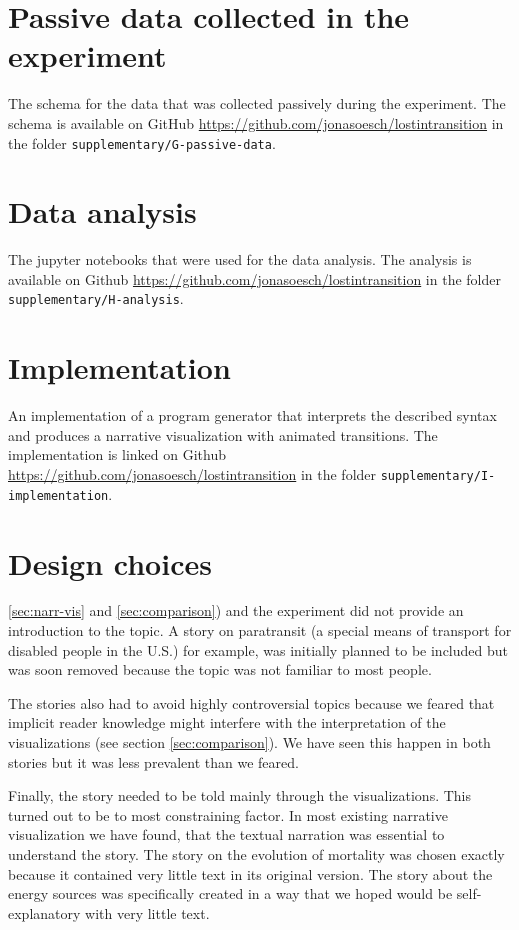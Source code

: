 \begin{flushleft}
\section{Passive data collected in the experiment} \label{appendix-passivedata}

The schema for the data that was collected passively during the experiment. The schema is available on GitHub \url{https://github.com/jonasoesch/lostintransition} in the folder \texttt{supplementary/G-passive-data}.

\section{Data analysis} \label{appendix-dataanalysis}

The jupyter notebooks that were used for the data analysis. The analysis is available on Github \url{https://github.com/jonasoesch/lostintransition} in the folder \texttt{supplementary/H-analysis}.


\section{Implementation} \label{appendix-implementation}

An implementation of a program generator that interprets the described syntax and produces a narrative visualization with animated transitions. The implementation is linked on Github \url{https://github.com/jonasoesch/lostintransition} in the folder \texttt{supplementary/I-implementation}.


\newpage
\section{Design choices} \label{appendix-designchoices}
\ref{sec:narr-vis} and \ref{sec:comparison}) and the experiment did not provide an introduction to the topic. A story on paratransit (a special
means of transport for disabled people in the U.S.) for example, was initially planned to be included but was soon removed because the topic
was not familiar to most people.

The stories also had to avoid highly controversial topics because we feared that implicit reader knowledge might interfere with the
interpretation of the visualizations (see section \ref{sec:comparison}). We have seen this happen in both stories but it was less prevalent than we feared.

Finally, the story needed to be told mainly through the visualizations.
This turned out to be to most constraining factor. In most existing
narrative visualization we have found, that the textual narration was
essential to understand the story. The story on the evolution of
mortality was chosen exactly because it contained very little
text in its original version. The story about the energy sources was
specifically created in a way that we hoped would be self-explanatory
with very little text.


\end{flushleft}
